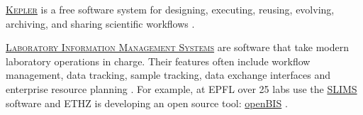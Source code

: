 \vspace{0.4cm}

\noindent {} \textsc{\href{https://kepler-project.org/}{Kepler}} is a free software system for designing, executing, reusing, evolving, archiving, and sharing scientific workflows \cite{kepler-project.org_kepler_2015,kepler-project.org_kepler_2015-1}.

\vspace{0.4cm}

\noindent {}    \textsc{\href{https://en.wikipedia.org/wiki/Laboratory_information_management_system}{Laboratory Information Management Systems}} are software that take modern laboratory operations in charge. Their features often include workflow management, data tracking, sample tracking, data exchange interfaces and enterprise resource planning \cite{wikipedia_laboratory_2015}. For example, at EPFL over 25 labs use the \href{http://sv-it.epfl.ch/slims}{SLIMS} software and ETHZ is developing an open source tool: \href{http://www.cisd.ethz.ch/software/openBIS}{openBIS} \cite{ethz_eth_2015,epfl_lsis_2015}.

